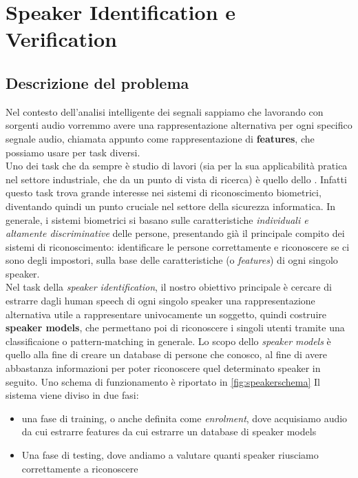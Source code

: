 \chapter{Speaker Identification e Verification}
\label{ch:speakerID}

\section{Descrizione del problema}
Nel contesto dell'analisi intelligente dei segnali sappiamo che lavorando con sorgenti audio
vorremmo avere una rappresentazione alternativa per ogni specifico segnale audio, chiamata appunto come
rappresentazione di \textbf{features}, che possiamo usare per task diversi. \\
Uno dei task che da sempre è studio di lavori (sia per la sua applicabilità pratica nel settore industriale, che
da un punto di vista di ricerca) è quello dello . Infatti questo task trova grande interesse nei sistemi
di riconoscimento biometrici, diventando quindi un punto cruciale nel settore della sicurezza informatica. In generale, i sistemi biometrici
si basano sulle caratteristiche \textit{individuali e altamente discriminative} delle persone, presentando già il principale compito dei sistemi di riconoscimento: identificare
le persone correttamente e riconoscere se ci sono degli impostori, sulla base delle caratteristiche (o \textit{features}) di ogni singolo speaker. \\
Nel task della \textit{speaker identification}, il nostro obiettivo principale è cercare di estrarre dagli human speech di ogni singolo speaker una rappresentazione alternativa utile a rappresentare univocamente un soggetto, quindi costruire \textbf{speaker models}, che permettano
poi di riconoscere i singoli utenti tramite una classificaione o pattern-matching in generale. Lo scopo dello \textit{speaker models} è quello 
alla fine di creare un database di persone che conosco, al fine di avere abbastanza informazioni per poter riconoscere quel determinato speaker in seguito. 
Uno schema di funzionamento è riportato in \ref{fig:speakerschema} Il sistema viene diviso in due fasi:
\begin{itemize}
    \item una fase di training, o anche definita come \textit{enrolment}, dove acquisiamo audio da cui estrarre features da cui estrarre un database di speaker models
    \item Una fase di testing, dove andiamo a valutare quanti speaker riusciamo correttamente a riconoscere 
\end{itemize}

